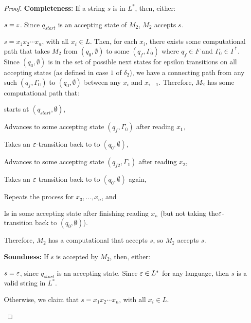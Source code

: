 \begin{problem}
\begin{enumalph}
\begin{Answer}
\begin{claim}
\begin{proof}
              \step
              \textbf{Completeness:}
                If a string $s$ is in $L^*$, then, either:
                \begin{enumroman}
                  \item $s = \varepsilon$. Since $q_{start}$ is an accepting state of $M_2$,
                    $M_2$ accepts $s$.
                  \item $s = x_1x_2 \cdots x_n$, with all $x_i \in L$.
                    Then, for each $x_i$, there exists some computational path that takes $M_2$
                    from $(q_0, \emptyset)$ to some $(q_f, \Gamma_0)$ where $q_f \in F$
                    and $\Gamma_0 \in \Gamma^*$.
                    Since $(q_0, \emptyset)$ is in the set of possible next states for epsilon
                    transitions on all accepting states (as defined in case $1$ of $\delta_2$),
                    we have a connecting path from any such $(q_f, \Gamma_0)$ to $(q_0, \emptyset)$
                    between any $x_i$ and $x_{i+1}$.
                    Therefore, $M_2$ has some computational path that:
                    \begin{enumroman}
                      \item starts at $(q_{start}, \emptyset)$,
                      \item Advances to some accepting state $(q_f, \Gamma_0)$ after reading $x_1$,
                      \item Takes an $\varepsilon$-transition back to to $(q_0, \emptyset)$,
                      \item Advances to some accepting state $(q_{f2}, \Gamma_1)$ after reading $x_2$,
                      \item Takes an $\varepsilon$-transition back to to $(q_0, \emptyset)$ again,
                      \item Repeats the process for $x_3, \ldots, x_n$, and
                      \item Is in some accepting state after finishing reading $x_n$ (but not taking
                        the$\varepsilon$-transition back to $(q_0, \emptyset)$).
                    \end{enumroman}
                    Therefore, $M_2$ has a computational that accepts $s$, so $M_2$ accepts $s$.
                \end{enumroman}
              
              \step
              \textbf{Soundness:}
                If $s$ is accepted by $M_2$, then, either:
                \begin{enumroman}
                  \item $s = \varepsilon$, since $q_{start}$ is an accepting state.
                    Since $\varepsilon \in L^*$ for any language, then $s$ is a valid
                    string in $L^*$.
                  \item Otherwise, we claim that $s = x_1x_2 \cdots x_n$,
                    with all $x_i \in L$.


\end{enumroman}
\end{proof}
\end{claim}
\end{Answer}
\end{enumalph}
\end{problem}
